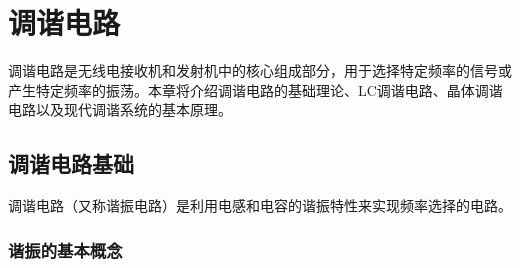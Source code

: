 
\chapter{调谐电路}
\label{chap:tuning_circuits}

调谐电路是无线电接收机和发射机中的核心组成部分，用于选择特定频率的信号或产生特定频率的振荡。本章将介绍调谐电路的基础理论、LC调谐电路、晶体调谐电路以及现代调谐系统的基本原理。

\section{调谐电路基础}
\label{sec:tuning_basics}

调谐电路（又称谐振电路）是利用电感和电容的谐振特性来实现频率选择的电路。

\subsection{谐振的基本概念}
\label{sec:resonance_concept}

